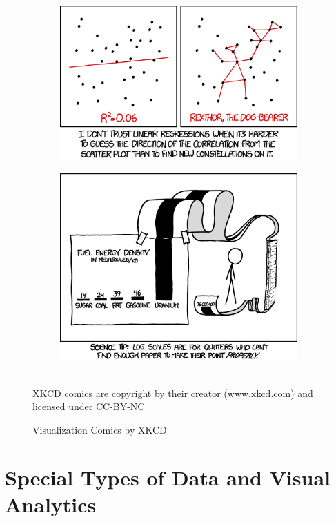 \begin{figure}
\hfill
\begin{subfigure}{.49\textwidth}
\centering
  \includegraphics[width=\textwidth]{xkcd_linear_regression.png}
\end{subfigure}
\hfill
\begin{subfigure}{.49\textwidth}
\centering
  \includegraphics[width=.9\textwidth]{xkcd_log_scale.png}
\end{subfigure}
 \\ 
\tiny \scriptsize{XKCD comics are copyright by their creator (\url{www.xkcd.com}) and licensed under CC-BY-NC}

\caption{Visualization Comics by XKCD}
\label{fig:xkcd}
\end{figure}


\section{Special Types of Data and Visual Analytics}

